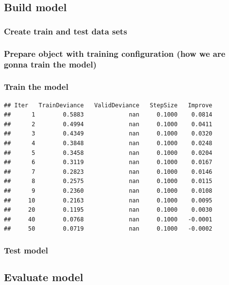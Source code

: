 \documentclass[
]{article}
\begin{document}
\subsection{Build model}\label{build-model}

\subsubsection{Create train and test data
sets}\label{create-train-and-test-data-sets}

\subsubsection{Prepare object with training configuration (how we are
gonna train the
model)}\label{prepare-object-with-training-configuration-how-we-are-gonna-train-the-model}

\subsubsection{Train the model}\label{train-the-model}

\begin{verbatim}
## Iter   TrainDeviance   ValidDeviance   StepSize   Improve
##      1        0.5883             nan     0.1000    0.0814
##      2        0.4994             nan     0.1000    0.0411
##      3        0.4349             nan     0.1000    0.0320
##      4        0.3848             nan     0.1000    0.0248
##      5        0.3458             nan     0.1000    0.0204
##      6        0.3119             nan     0.1000    0.0167
##      7        0.2823             nan     0.1000    0.0146
##      8        0.2575             nan     0.1000    0.0115
##      9        0.2360             nan     0.1000    0.0108
##     10        0.2163             nan     0.1000    0.0095
##     20        0.1195             nan     0.1000    0.0030
##     40        0.0768             nan     0.1000   -0.0001
##     50        0.0719             nan     0.1000   -0.0002
\end{verbatim}

\subsubsection{Test model}\label{test-model}

\subsection{Evaluate model}\label{evaluate-model}
\end{document}
